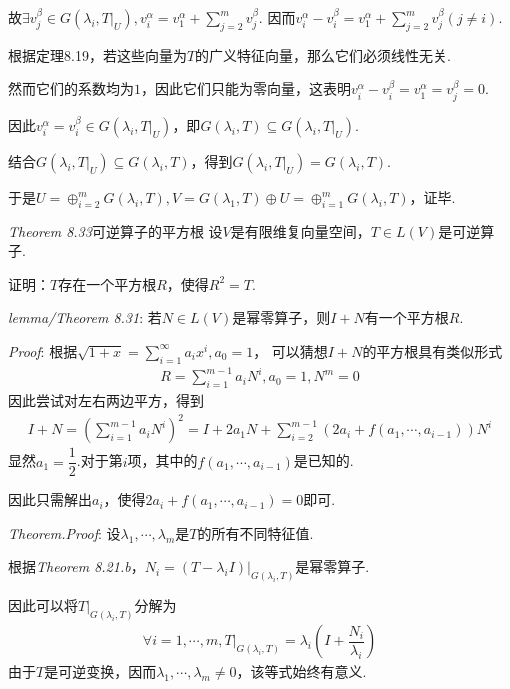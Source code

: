 故\(\exists v_j^\beta \in G(\lambda_i,T|_U),v_i^\alpha=v_1^\alpha+\sum_{j=2}^m v_j^\beta\).
因而\(v_i^\alpha-v_i^\beta=v_1^\alpha+\sum_{j=2}^m v_j^\beta(j \ne i)\).

根据定理8.19，若这些向量为\(T\)的广义特征向量，那么它们必须线性无关.

然而它们的系数均为\(1\)，因此它们只能为零向量，这表明\(v_i^\alpha-v_i^\beta=v_1^\alpha=v_j^\beta=0\).

因此\(v_i^\alpha=v_i^\beta \in G(\lambda_i,T|_U)\)，即\(G(\lambda_i,T) \subseteq G(\lambda_i,T|_U)\).

结合\(G(\lambda_i,T|_U) \subseteq G(\lambda_i,T)\)，得到\(G(\lambda_i,T|_U)=G(\lambda_i,T)\).

于是\(U=\oplus_{i=2}^m G(\lambda_i,T),V=G(\lambda_1,T) \oplus U=\oplus_{i=1}^m G(\lambda_i,T)\)，证毕.

\newpage

\textit{Theorem 8.33}{\kaishu 可逆算子的平方根}
设\(V\)是有限维复向量空间，\(T \in L(V)\)是可逆算子.

证明：\(T\)存在一个平方根\(R\)，使得\(R^2=T\).

\textit{lemma/Theorem 8.31}:
若\(N \in L(V)\)是幂零算子，则\(I+N\)有一个平方根\(R\).

\textit{Proof}:
根据\(\sqrt{1+x}=\sum_{i=1}^\infty a_ix^i,a_0=1\)，
可以猜想\(I+N\)的平方根具有类似形式
    \begin{align*}
        R=\sum_{i=1}^{m-1} a_iN^i,a_0=1,N^m=0
    \end{align*}
因此尝试对左右两边平方，得到
    \begin{align*}
        I+N = (\sum_{i=1}^{m-1} a_iN^i)^2 
            = I+2a_1N+\sum_{i=2}^{m-1} (2a_i+f(a_1,\cdots,a_{i-1}))N^i
    \end{align*}
显然\(a_1=\dfrac{1}{2}\).对于第\(i\)项，其中的\(f(a_1,\cdots,a_{i-1})\)是已知的.

因此只需解出\(a_i\)，使得\(2a_i+f(a_1,\cdots,a_{i-1})=0\)即可.

\textit{Theorem.Proof}:
设\(\lambda_1,\cdots,\lambda_m\)是\(T\)的所有不同特征值.

根据\textit{Theorem 8.21.b}，\(N_i=(T-\lambda_i I)|_{G(\lambda_i,T)}\)是幂零算子.

因此可以将\(T|_{G(\lambda_i,T)}\)分解为
    \begin{align*}
        \forall i=1,\cdots,m,T|_{G(\lambda_i,T)}=\lambda_i(I+\dfrac{N_i}{\lambda_i})
    \end{align*}
由于\(T\)是可逆变换，因而\(\lambda_1,\cdots,\lambda_m \ne 0\)，该等式始终有意义.

